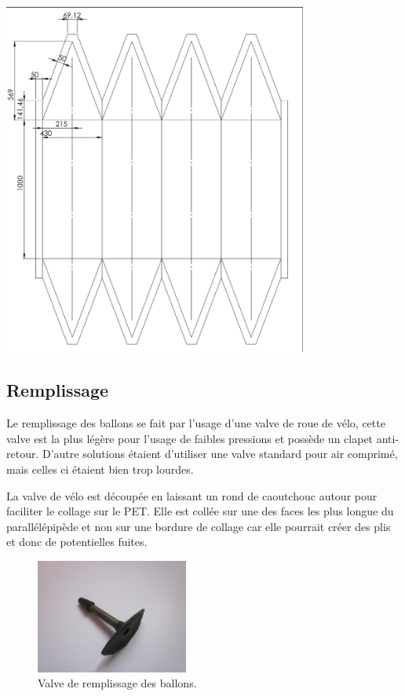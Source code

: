 \documentclass[a4paper,11pt]{article}
\begin{document}
\begin{center}
 \includegraphics[width=10cm]{../Images/plan_ballon.png}
\end{center}


\subsection{Remplissage}

Le remplissage des ballons se fait par l'usage d'une valve de roue de vélo, cette valve est la plus légère pour l'usage de faibles pressions et possède un clapet anti-retour. D'autre solutions étaient d'utiliser une valve standard pour air comprimé, mais celles ci étaient bien trop lourdes.

La valve de vélo est découpée en laissant un rond de caoutchouc autour pour faciliter le collage sur le PET. Elle est collée sur une des faces les plus longue du parallélépipède et non sur une bordure de collage car elle pourrait créer des plis et donc de potentielles fuites.

\begin{figure}[H]
  \centering
  \includegraphics[width=5cm]{../Images/valve.JPG}
  \caption{Valve de remplissage des ballons.}
\end{figure}
\end{document}
